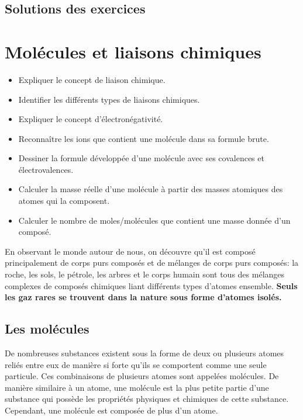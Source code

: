 \documentclass[
  11pt,
  a4paper,
  openany]{book}
\providecommand{\tightlist}{%
  \setlength{\itemsep}{0pt}\setlength{\parskip}{0pt}}
\begin{document}
\newpage

\section{Solutions des exercices} \shipoutAnswer

\hypertarget{moluxe9cules-et-liaisons-chimiques}{%
\chapter{Molécules et liaisons chimiques}\label{moluxe9cules-et-liaisons-chimiques}}

\begin{objectives}

\begin{itemize}
\tightlist
\item
  Expliquer le concept de liaison chimique.
\item
  Identifier les différents types de liaisons chimiques.
\item
  Expliquer le concept d'électronégativité.
\item
  Reconnaître les ions que contient une molécule dans sa formule brute.
\item
  Dessiner la formule développée d'une molécule avec ses covalences et électrovalences.
\item
  Calculer la masse réelle d'une molécule à partir des masses atomiques des atomes qui la composent.
\item
  Calculer le nombre de moles/molécules que contient une masse donnée d'un composé.
\end{itemize}

\end{objectives}

En observant le monde autour de nous, on découvre qu'il est composé principalement de corps purs composés et de mélanges de corps purs composés: la roche, les sols, le pétrole, les arbres et le corps humain sont tous des mélanges complexes de composés chimiques liant différents types d'atomes ensemble. \textbf{Seuls les gaz rares se trouvent dans la nature sous forme d'atomes isolés.}

\hypertarget{les-moluxe9cules}{%
\section{Les molécules}\label{les-moluxe9cules}}

De nombreuses substances existent sous la forme de deux ou plusieurs atomes reliés entre eux de manière si forte qu'ils se comportent comme une seule particule. Ces combinaisons de plusieurs atomes sont appelées molécules. De manière similaire à un atome, une molécule est la plus petite partie d'une substance qui possède les propriétés physiques et chimiques de cette substance. Cependant, une molécule est composée de plus d'un atome.
\end{document}
